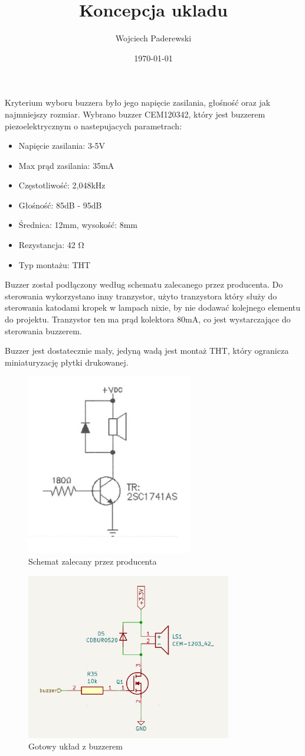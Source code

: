 \documentclass[../../main.tex]{subfiles}
\author{Wojciech Paderewski}
\date{\today}
\title{Koncepcja ukladu}
\begin{document}
Kryterium wyboru buzzera było jego napięcie zasilania, głośność oraz jak najmniejszy rozmiar.
Wybrano buzzer CEM120342, który jest buzzerem piezoelektrycznym o nastepujacych parametrach:

\begin{itemize}
    \item Napięcie zasilania: 3-5V
    \item Max prąd zasilania: 35mA
    \item Częstotliwość: 2,048kHz
    \item Głośność: 85dB - 95dB
    \item Średnica: 12mm, wysokość: 8mm
    \item Rezystancja: 42 \si{\ohm}
    \item Typ montażu: THT
\end{itemize}

Buzzer został podłączony według schematu zalecanego przez producenta. Do sterowania wykorzystano inny tranzystor,
użyto tranzystora który służy do sterowania katodami kropek w lampach nixie, by nie dodawać kolejnego elementu do projektu.
Tranzystor ten ma prąd kolektora 80mA, co jest wystarczające do sterowania buzzerem.

Buzzer jest dostatecznie mały, jedyną wadą jest montaż THT, który ogranicza miniaturyzację płytki drukowanej.

\begin{figure}[H]
    \centering
    \includegraphics[width=0.65\textwidth]{buzzer_karta.png}
    \caption{Schemat zalecany przez producenta}
\end{figure}

\begin{figure}[H]
    \centering
    \includegraphics[width=0.8\textwidth]{buzzer.png}
    \caption{Gotowy układ z buzzerem}
\end{figure}
\end{document}
